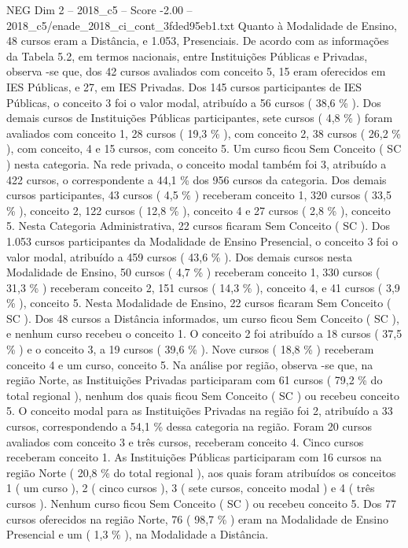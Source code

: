 \begin{textsample}{NEG Dim 2 – 2018\_c5 – Score -2.00 – 2018\_c5/enade\_2018\_ci\_cont\_3fded95eb1.txt}
Quanto à Modalidade de Ensino, 48 cursos eram a Distância, e 1.053, Presenciais.
De acordo com as informações da Tabela 5.2, em termos nacionais, entre Instituições Públicas e Privadas, observa -se que, dos 42 cursos avaliados com conceito 5, 15 eram oferecidos em IES Públicas, e 27, em IES Privadas.
Dos 145 cursos participantes de IES Públicas, o conceito 3 foi o valor modal, atribuído a 56 cursos ( 38,6 \% ).
Dos demais cursos de Instituições Públicas participantes, sete cursos ( 4,8 \% ) foram avaliados com conceito 1, 28 cursos ( 19,3 \% ), com conceito 2, 38 cursos ( 26,2 \% ), com conceito, 4 e 15 cursos, com conceito 5.
Um curso ficou Sem Conceito ( SC ) nesta categoria.
Na rede privada, o conceito modal também foi 3, atribuído a 422 cursos, o correspondente a 44,1 \% dos 956 cursos da categoria.
Dos demais cursos participantes, 43 cursos ( 4,5 \% ) receberam conceito 1, 320 cursos ( 33,5 \% ), conceito 2, 122 cursos ( 12,8 \% ), conceito 4 e 27 cursos ( 2,8 \% ), conceito 5.
Nesta Categoria Administrativa, 22 cursos ficaram Sem Conceito ( SC ).
Dos 1.053 cursos participantes da Modalidade de Ensino Presencial, o conceito 3 foi o valor modal, atribuído a 459 cursos ( 43,6 \% ).
Dos demais cursos nesta Modalidade de Ensino, 50 cursos ( 4,7 \% ) receberam conceito 1, 330 cursos ( 31,3 \% ) receberam conceito 2, 151 cursos ( 14,3 \% ), conceito 4, e 41 cursos ( 3,9 \% ), conceito 5.
Nesta Modalidade de Ensino, 22 cursos ficaram Sem Conceito ( SC ).
Dos 48 cursos a Distância informados, um curso ficou Sem Conceito ( SC ), e nenhum curso recebeu o conceito 1.
O conceito 2 foi atribuído a 18 cursos ( 37,5 \% ) e o conceito 3, a 19 cursos ( 39,6 \% ).
Nove cursos ( 18,8 \% ) receberam conceito 4 e um curso, conceito 5.
Na análise por região, observa -se que, na região Norte, as Instituições Privadas participaram com 61 cursos ( 79,2 \% do total regional ), nenhum dos quais ficou Sem Conceito ( SC ) ou recebeu conceito 5.
O conceito modal para as Instituições Privadas na região foi 2, atribuído a 33 cursos, correspondendo a 54,1 \% dessa categoria na região.
Foram 20 cursos avaliados com conceito 3 e três cursos, receberam conceito 4.
Cinco cursos receberam conceito 1.
As Instituições Públicas participaram com 16 cursos na região Norte ( 20,8 \% do total regional ), aos quais foram atribuídos os conceitos 1 ( um curso ), 2 ( cinco cursos ), 3 ( sete cursos, conceito modal ) e 4 ( três cursos ).
Nenhum curso ficou Sem Conceito ( SC ) ou recebeu conceito 5.
Dos 77 cursos oferecidos na região Norte, 76 ( 98,7 \% ) eram na Modalidade de Ensino Presencial e um ( 1,3 \% ), na Modalidade a Distância.

\end{textsample}
